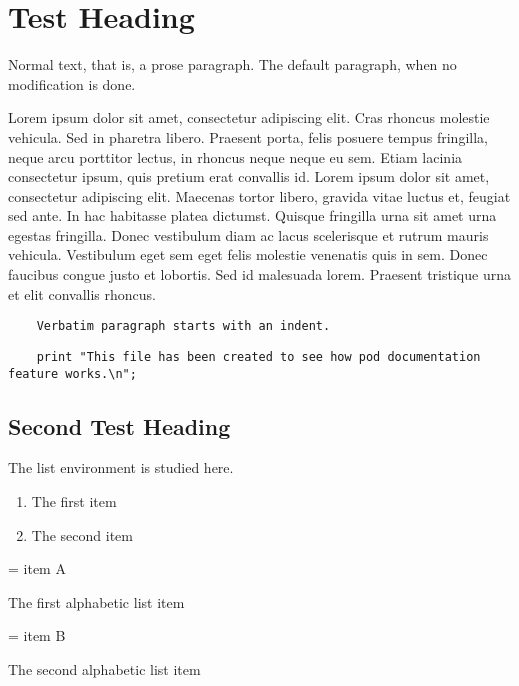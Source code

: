\section{Test Heading\label{Test_Heading}}


Normal text, that is, a prose paragraph. The default paragraph, when no modification is done.



Lorem ipsum dolor sit amet, consectetur adipiscing elit. Cras rhoncus molestie vehicula. Sed in pharetra libero. Praesent porta, felis posuere tempus fringilla, neque arcu porttitor lectus, in rhoncus neque neque eu sem. Etiam lacinia consectetur ipsum, quis pretium erat convallis id. Lorem ipsum dolor sit amet, consectetur adipiscing elit. Maecenas tortor libero, gravida vitae luctus et, feugiat sed ante. In hac habitasse platea dictumst. Quisque fringilla urna sit amet urna egestas fringilla. Donec vestibulum diam ac lacus scelerisque et rutrum mauris vehicula. Vestibulum eget sem eget felis molestie venenatis quis in sem. Donec faucibus congue justo et lobortis. Sed id malesuada lorem. Praesent tristique urna et elit convallis rhoncus.

\begin{verbatim}
    Verbatim paragraph starts with an indent.
\end{verbatim}
\begin{verbatim}
    print "This file has been created to see how pod documentation feature works.\n";
\end{verbatim}
\subsection*{Second Test Heading\label{Second_Test_Heading}}


The list environment is studied here.

\begin{enumerate}

\item 

The first item


\item 

The second item

\end{enumerate}


= item A



The first alphabetic list item



= item B



The second alphabetic list item

